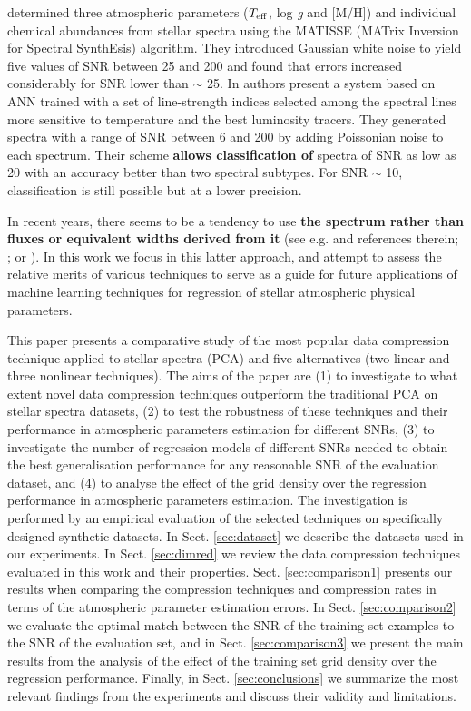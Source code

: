 \documentclass[a4paper,fleqn,usenatbib]{mnras}
\begin{document}
\cite{recio:06} determined three atmospheric parameters
($T_{\rm eff}$, log \textit{g} and [M/H]) and individual chemical
abundances from stellar spectra using the MATISSE (MATrix
Inversion for Spectral SynthEsis) algorithm. They introduced Gaussian
white noise to yield five values of SNR between 25 and 200 and found
that errors increased considerably for SNR lower than $\sim$ 25.  In
\cite{navarro:12} authors present a system based on ANN trained with
a set of line-strength indices selected among the spectral lines more
sensitive to temperature and the best luminosity tracers. They
generated spectra with a range of SNR between 6 and 200 by adding
Poissonian noise to each spectrum. Their scheme {\bf allows classification
of} spectra of SNR as low as 20 with an accuracy better than two spectral
subtypes. For SNR $\sim$ 10, classification is still possible but at a
lower precision.

In recent years, there seems to be a tendency to use {\bf the spectrum
rather than fluxes or equivalent widths derived from it} 
(see e.g. \citealt{2012ApJ...757..161T,2014A&A...567A...5R} and references therein; 
\citealt{2015ApJ...808...16N,2015MNRAS.448.2717W}; or \citealt{2015arXiv151000111R}). 
In this work we focus in this latter approach, and attempt to assess the
relative merits of various techniques to serve as a guide for future
applications of machine learning techniques for regression of stellar
atmospheric physical parameters.

This paper presents a comparative study of the most popular
data compression technique applied to stellar spectra (PCA)
and five alternatives (two linear and three nonlinear techniques). The
aims of the paper are (1) to investigate to what extent novel
data compression techniques outperform the traditional PCA on
stellar spectra datasets, (2) to test the robustness of these
techniques and their performance in atmospheric parameters estimation
for different SNRs, (3) to investigate the number of regression models
of different SNRs needed to obtain the best generalisation performance
for any reasonable SNR of the evaluation dataset, and (4) to analyse the effect
of the grid density over the regression performance in atmospheric
parameters estimation.  The investigation is performed by an empirical
evaluation of the selected techniques on specifically designed
synthetic datasets. In Sect. \ref{sec:dataset} we describe the datasets 
used in our experiments. In Sect. \ref{sec:dimred} we review the data compression
techniques evaluated in this work and their properties.  
Sect. \ref{sec:comparison1} presents our results when comparing the 
compression techniques and compression rates in terms of the atmospheric 
parameter estimation errors. In Sect. \ref{sec:comparison2} we evaluate 
the optimal match between the SNR of the training set examples to the SNR 
of the evaluation set, and in Sect. \ref{sec:comparison3} we present 
the main results from the analysis of the effect of the training set grid 
density over the regression performance. Finally, in Sect. 
\ref{sec:conclusions} we summarize the most relevant findings from 
the experiments and discuss their validity and limitations.
\end{document}
